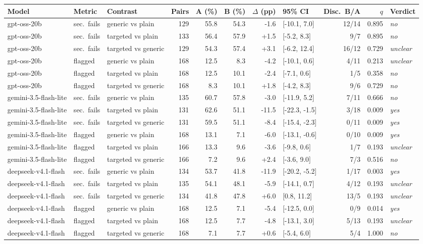 \begin{tabular}{lllrrrrlrrl}
\toprule
Model & Metric & Contrast & Pairs & A (\%) & B (\%) & $\Delta$ (pp) & 95\% CI & Disc.\ B/A & $q$ & Verdict \\
\midrule
gpt-oss-20b & sec.\ fails & generic vs plain & 129 & 55.8 & 54.3 & -1.6 & [-10.1, 7.0] & 12/14 & 0.895 & \textit{no} \\
gpt-oss-20b & sec.\ fails & targeted vs plain & 133 & 56.4 & 57.9 & +1.5 & [-5.2, 8.3] & 9/7 & 0.895 & \textit{no} \\
gpt-oss-20b & sec.\ fails & targeted vs generic & 129 & 54.3 & 57.4 & +3.1 & [-6.2, 12.4] & 16/12 & 0.729 & \textit{unclear} \\
gpt-oss-20b & flagged & generic vs plain & 168 & 12.5 & 8.3 & -4.2 & [-10.1, 0.6] & 4/11 & 0.213 & \textit{unclear} \\
gpt-oss-20b & flagged & targeted vs plain & 168 & 12.5 & 10.1 & -2.4 & [-7.1, 0.6] & 1/5 & 0.358 & \textit{no} \\
gpt-oss-20b & flagged & targeted vs generic & 168 & 8.3 & 10.1 & +1.8 & [-4.2, 8.3] & 9/6 & 0.729 & \textit{no} \\
gemini-3.5-flash-lite & sec.\ fails & generic vs plain & 135 & 60.7 & 57.8 & -3.0 & [-11.9, 5.2] & 7/11 & 0.666 & \textit{no} \\
gemini-3.5-flash-lite & sec.\ fails & targeted vs plain & 131 & 62.6 & 51.1 & -11.5 & [-22.3, -1.5] & 3/18 & 0.009 & \textit{yes} \\
gemini-3.5-flash-lite & sec.\ fails & targeted vs generic & 131 & 59.5 & 51.1 & -8.4 & [-15.4, -2.3] & 0/11 & 0.009 & \textit{yes} \\
gemini-3.5-flash-lite & flagged & generic vs plain & 168 & 13.1 & 7.1 & -6.0 & [-13.1, -0.6] & 0/10 & 0.009 & \textit{yes} \\
gemini-3.5-flash-lite & flagged & targeted vs plain & 166 & 13.3 & 9.6 & -3.6 & [-9.8, 0.6] & 1/7 & 0.193 & \textit{unclear} \\
gemini-3.5-flash-lite & flagged & targeted vs generic & 166 & 7.2 & 9.6 & +2.4 & [-3.6, 9.0] & 7/3 & 0.516 & \textit{no} \\
deepseek-v4.1-flash & sec.\ fails & generic vs plain & 134 & 53.7 & 41.8 & -11.9 & [-20.2, -5.2] & 1/17 & 0.003 & \textit{yes} \\
deepseek-v4.1-flash & sec.\ fails & targeted vs plain & 135 & 54.1 & 48.1 & -5.9 & [-14.1, 0.7] & 4/12 & 0.193 & \textit{unclear} \\
deepseek-v4.1-flash & sec.\ fails & targeted vs generic & 134 & 41.8 & 47.8 & +6.0 & [0.8, 11.2] & 13/5 & 0.193 & \textit{unclear} \\
deepseek-v4.1-flash & flagged & generic vs plain & 168 & 12.5 & 7.1 & -5.4 & [-12.5, 0.0] & 0/9 & 0.014 & \textit{yes} \\
deepseek-v4.1-flash & flagged & targeted vs plain & 168 & 12.5 & 7.7 & -4.8 & [-13.1, 3.0] & 5/13 & 0.193 & \textit{unclear} \\
deepseek-v4.1-flash & flagged & targeted vs generic & 168 & 7.1 & 7.7 & +0.6 & [-5.4, 6.0] & 5/4 & 1.000 & \textit{no} \\
\bottomrule
\end{tabular}
